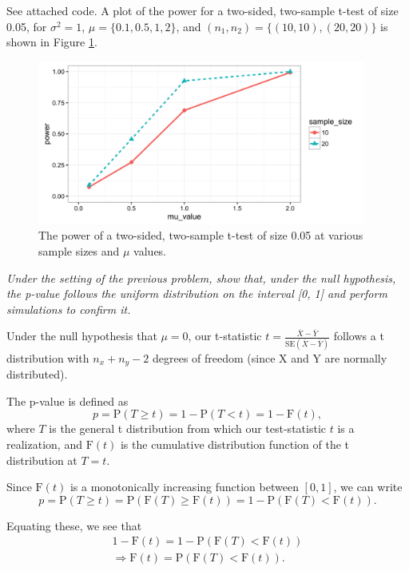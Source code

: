 \documentclass[11pt]{exam} %
\begin{document}
\begin{questions}
See attached code. A plot of the power for a two-sided, two-sample t-test of size 0.05, for $\sigma^2 =1$, $\mu = \{0.1, 0.5, 1, 2 \}$, and $(n_1, n_2) = \{(10,10), (20,20)\}$ is shown in Figure \ref{fig:6}.

\begin{figure}[!h]
	\centering
	\includegraphics[width=4.25in]{6.png}
	\caption{The power of a two-sided, two-sample t-test of size 0.05 at various sample sizes and $\mu$ values.}
	\label{fig:6}
\end{figure}



\titledquestion{} %
\textit{Under the setting of the previous problem, show that, under the null hypothesis, the p-value follows the uniform distribution on the interval [0, 1] and perform simulations to confirm it.}

Under the null hypothesis that $\mu=0$, our t-statistic $t=\frac{\overline{X}-\overline{Y}}{\text{SE}(\overline{X}-\overline{Y})}$ follows a t distribution with $n_x + n_y -2$ degrees of freedom (since X and Y are normally distributed).

The p-value is defined as
$$p = \text{P}(T \geq t) = 1-\text{P}(T < t) = 1-\text{F}(t),$$
where $T$ is the general t distribution from which our test-statistic $t$ is a realization, and $\text{F}(t)$ is the cumulative distribution function of the t distribution at $T=t$.

Since $\text{F}(t)$ is a monotonically increasing function between $[0,1]$, we can write
$$p = \text{P}(T \geq t) = \text{P}(\text{F}(T) \geq \text{F}(t)) = 1 - \text{P}(\text{F}(T) < \text{F}(t)).$$

Equating these, we see that
\begin{gather*}
1-\text{F}(t) = 1 - \text{P}(\text{F}(T) < \text{F}(t)) \\
\Rightarrow \text{F}(t) = \text{P}(\text{F}(T) < \text{F}(t)).
\end{gather*}


\end{questions}
\end{document}
